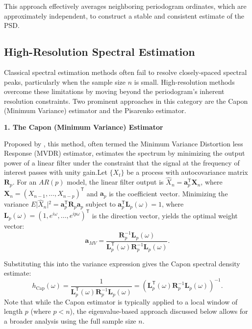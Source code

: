 \documentclass[twoside]{article}
\begin{document}
This approach effectively averages neighboring periodogram ordinates, which are approximately independent, to construct a stable and consistent estimate of the PSD.





\subsection{High-Resolution Spectral Estimation}
Classical spectral estimation methods often fail to resolve closely-spaced spectral peaks, particularly when the sample size $n$ is small. High-resolution methods overcome these limitations by moving beyond the periodogram's inherent resolution constraints. Two prominent approaches in this category are the Capon (Minimum Variance) estimator and the Pisarenko estimator.



\textbf{1. The Capon (Minimum Variance) Estimator}



Proposed by \cite{Capon:1969}, this method, often termed the Minimum Variance Distortion less Response (MVDR) estimator, estimates the spectrum by minimizing the output power of a linear filter under the constraint that the signal at the frequency of interest passes with unity gain.Let $\{X_t\}$ be a process with autocovariance matrix $\mathbf{R}_p$. For an $AR(p)$ model, the linear filter output is $\hat{X}_n = \mathbf{a}_p^{\mathsf{T}} \mathbf{X}_n$, where $\mathbf{X}_n = (X_{n-1}, \dots, X_{n-p})^{\mathsf{T}}$ and $\mathbf{a}_p$ is the coefficient vector. Minimizing the variance $E\vert{}\hat{X}_n\vert{}^2 = \mathbf{a}_p^{\mathsf{T}} \mathbf{R}_p \mathbf{a}_p$ subject to $\mathbf{a}_p^{\mathsf{T}} \mathbf{L}_p(\omega) = 1$, where $\mathbf{L}_p(\omega) = (1, e^{i\omega}, \dots, e^{ip\omega})^{\mathsf{T}}$ is the direction vector, yields the optimal weight vector:
\begin{equation}
\mathbf{a}_{MV} = \frac{\mathbf{R}_p^{-1} \mathbf{L}_p(\omega)}{\mathbf{L}_p^{\mathsf{T}}(\omega) \mathbf{R}_p^{-1} \mathbf{L}_p(\omega)}.
\end{equation}



Substituting this into the variance expression gives the Capon spectral density estimate:
\begin{equation}
h_{\mathrm{Cap}}(\omega) = \frac{1}{\mathbf{L}_p^{\mathsf{T}}(\omega) \mathbf{R}_p^{-1} \mathbf{L}_p(\omega)}
= \left( \mathbf{L}_p^{\mathsf{T}}(\omega) \mathbf{R}_p^{-1} \mathbf{L}_p(\omega) \right)^{-1}.
\label{eq:capon}
\end{equation}
Note that while the Capon estimator is typically applied to a local window of length $p$ (where $p < n$), the eigenvalue-based approach discussed below allows for a broader analysis using the full sample size $n$.
\end{document}
